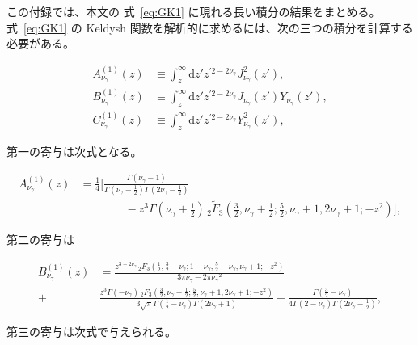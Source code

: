 \documentclass[a4paper,11pt]{ltjsarticle}
\numberwithin{equation}{section}
\newcommand{\dd}{\mathrm{d}}
\newcommand{\Eq}[1]{Eq.~(\ref{#1})}
\renewcommand{\Eq}[1]{式~\eqref{#1}}
\begin{document}
この付録では、本文の \Eq{eq:GK1} に現れる長い積分の結果をまとめる。\Eq{eq:GK1} の Keldysh 関数を解析的に求めるには、次の三つの積分を計算する必要がある。

\begin{align}
A^{(1)}_{\nu_\gamma}(z) &\equiv \int_{z}^{\infty} \dd z' z^{\prime2 - 2{\nu_\gamma}} J^2_{\nu_\gamma}(z'), \\
        B^{(1)}_{\nu_\gamma}(z) &\equiv \int_{z}^{\infty} \dd z' z^{\prime2 - 2{\nu_\gamma}} J_{\nu_\gamma}(z') Y_{\nu_\gamma}(z'), \\
        C^{(1)}_{\nu_\gamma}(z)&\equiv \int_{z}^{\infty} \dd z' z^{\prime2 - 2{\nu_\gamma}} Y^2_{\nu_\gamma}(z'),
\end{align}

第一の寄与は次式となる。

\begin{align}
    A^{(1)}_{\nu_\gamma}(z) &= \frac{1}{4} \bigg[\frac{\Gamma ({\nu_\gamma} -1)}{\Gamma \left({\nu_\gamma} -\frac{1}{2}\right) \Gamma \left(2 {\nu_\gamma} -\frac{1}{2}\right)} \label{eq:Fbeta} \nonumber\\
&\qquad \qquad -z^3 \Gamma \left({\nu_\gamma} +\frac{1}{2}\right) \, _2\tilde{F}_3\left(\frac{3}{2},{\nu_\gamma} +\frac{1}{2};\frac{5}{2},{\nu_\gamma} +1,2 {\nu_\gamma} +1;-z^2\right)\Bigg], 
\end{align}

第二の寄与は

\begin{align} 
B^{(1)}_{\nu_\gamma}(z) 
 &=\frac{z^{3-2 {\nu_\gamma} } \, _2F_3\left(\frac{1}{2},\frac{3}{2}-{\nu_\gamma} ;1-{\nu_\gamma} ,\frac{5}{2}-{\nu_\gamma} ,{\nu_\gamma} +1;-z^2\right)}{3 \pi  {\nu_\gamma} -2 \pi  {\nu_\gamma} ^2}  \label{eq:Gbeta} \nonumber \\
 +&\frac{z^3 \Gamma (-{\nu_\gamma} ) \, _2F_3\left(\frac{3}{2},{\nu_\gamma} +\frac{1}{2};\frac{5}{2},{\nu_\gamma} +1,2 {\nu_\gamma} +1;-z^2\right)}{3 \sqrt{\pi } \Gamma \left(\frac{1}{2}-{\nu_\gamma} \right) \Gamma (2 {\nu_\gamma} +1)}-\frac{\Gamma \left(\frac{3}{2}-{\nu_\gamma} \right)}{4 \Gamma (2-{\nu_\gamma} ) \Gamma \left(2 {\nu_\gamma} -\frac{1}{2}\right)},
\end{align}

第三の寄与は次式で与えられる。
\end{document}
